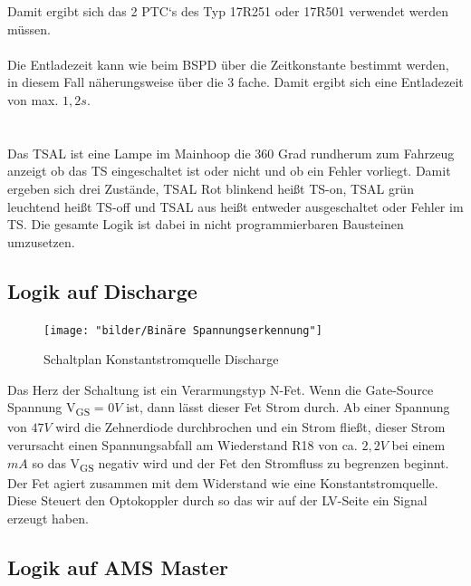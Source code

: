 Damit ergibt sich das 2 \ac{PTC}`s des Typ 17R251 oder 17R501 verwendet werden müssen. 
\\
\\
Die Entladezeit kann wie beim \ac{BSPD} über die Zeitkonstante bestimmt werden, in diesem Fall näherungsweise über die 3 fache. Damit ergibt sich eine Entladezeit von max. \ensuremath{1,2 s}.

\FloatBarrier
\section{}
Das \ac{TSAL} ist eine Lampe im Mainhoop die 360 Grad rundherum zum Fahrzeug anzeigt ob das \ac{TS} eingeschaltet ist oder nicht und ob ein Fehler vorliegt. Damit ergeben sich drei Zustände, \ac{TSAL} Rot blinkend heißt \ac{TS}-on, \ac{TSAL} grün leuchtend heißt \ac{TS}-off und \ac{TSAL} aus heißt entweder  ausgeschaltet oder Fehler im \ac{TS}. Die gesamte Logik ist dabei in nicht programmierbaren Bausteinen umzusetzen.

\FloatBarrier
\subsection{Logik auf Discharge}
\label{sec: TSAL Logik Discharge}
\begin{figure}
	\centering
	\texttt{[image: "bilder/Binäre Spannungserkennung"]}
	\caption{Schaltplan Konstantstromquelle Discharge}
	\label{fig:binare-spannungserkennung}
\end{figure}

Das Herz der Schaltung ist ein Verarmungstyp N-Fet. Wenn die Gate-Source Spannung V\textsubscript{GS} = \ensuremath{0 V} ist, dann lässt dieser Fet Strom durch. Ab einer Spannung von \ensuremath{47 V} wird die Zehnerdiode durchbrochen und ein Strom fließt, dieser Strom verursacht einen Spannungsabfall am Wiederstand R18 von ca. \ensuremath{2,2 V} bei einem \ensuremath{mA} so das V\textsubscript{GS} negativ wird und der Fet den Stromfluss zu begrenzen beginnt. Der Fet agiert zusammen mit dem Widerstand wie eine Konstantstromquelle. Diese Steuert den Optokoppler durch so das wir auf der \ac{LV}-Seite ein Signal erzeugt haben.

\FloatBarrier
\subsection{Logik auf \ac{AMS} Master}

